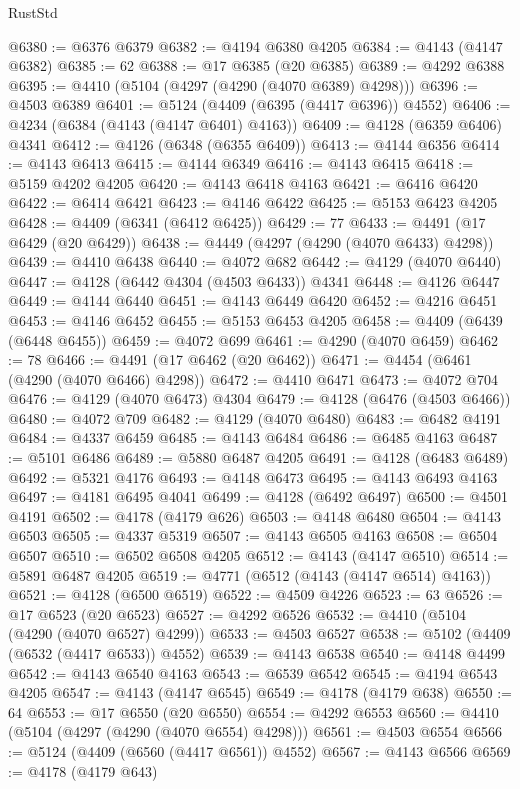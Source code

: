 \begin{lexlean}{RustStd}
\begin{coremodule}
@6380 := @6376 @6379
@6382 := @4194 @6380 @4205
@6384 := @4143 (@4147 @6382)
@6385 := 62
@6388 := @17 @6385 (@20 @6385)
@6389 := @4292 @6388
@6395 := @4410 (@5104 (@4297 (@4290 (@4070 @6389) @4298)))
@6396 := @4503 @6389
@6401 := @5124 (@4409 (@6395 (@4417 @6396)) @4552)
@6406 := @4234 (@6384 (@4143 (@4147 @6401) @4163))
@6409 := @4128 (@6359 @6406) @4341
@6412 := @4126 (@6348 (@6355 @6409))
@6413 := @4144 @6356
@6414 := @4143 @6413
@6415 := @4144 @6349
@6416 := @4143 @6415
@6418 := @5159 @4202 @4205
@6420 := @4143 @6418 @4163
@6421 := @6416 @6420
@6422 := @6414 @6421
@6423 := @4146 @6422
@6425 := @5153 @6423 @4205
@6428 := @4409 (@6341 (@6412 @6425))
@6429 := 77
@6433 := @4491 (@17 @6429 (@20 @6429))
@6438 := @4449 (@4297 (@4290 (@4070 @6433) @4298))
@6439 := @4410 @6438
@6440 := @4072 @682
@6442 := @4129 (@4070 @6440)
@6447 := @4128 (@6442 @4304 (@4503 @6433)) @4341
@6448 := @4126 @6447
@6449 := @4144 @6440
@6451 := @4143 @6449 @6420
@6452 := @4216 @6451
@6453 := @4146 @6452
@6455 := @5153 @6453 @4205
@6458 := @4409 (@6439 (@6448 @6455))
@6459 := @4072 @699
@6461 := @4290 (@4070 @6459)
@6462 := 78
@6466 := @4491 (@17 @6462 (@20 @6462))
@6471 := @4454 (@6461 (@4290 (@4070 @6466) @4298))
@6472 := @4410 @6471
@6473 := @4072 @704
@6476 := @4129 (@4070 @6473) @4304
@6479 := @4128 (@6476 (@4503 @6466))
@6480 := @4072 @709
@6482 := @4129 (@4070 @6480)
@6483 := @6482 @4191
@6484 := @4337 @6459
@6485 := @4143 @6484
@6486 := @6485 @4163
@6487 := @5101 @6486
@6489 := @5880 @6487 @4205
@6491 := @4128 (@6483 @6489)
@6492 := @5321 @4176
@6493 := @4148 @6473
@6495 := @4143 @6493 @4163
@6497 := @4181 @6495 @4041
@6499 := @4128 (@6492 @6497)
@6500 := @4501 @4191
@6502 := @4178 (@4179 @626)
@6503 := @4148 @6480
@6504 := @4143 @6503
@6505 := @4337 @5319
@6507 := @4143 @6505 @4163
@6508 := @6504 @6507
@6510 := @6502 @6508 @4205
@6512 := @4143 (@4147 @6510)
@6514 := @5891 @6487 @4205
@6519 := @4771 (@6512 (@4143 (@4147 @6514) @4163))
@6521 := @4128 (@6500 @6519)
@6522 := @4509 @4226
@6523 := 63
@6526 := @17 @6523 (@20 @6523)
@6527 := @4292 @6526
@6532 := @4410 (@5104 (@4290 (@4070 @6527) @4299))
@6533 := @4503 @6527
@6538 := @5102 (@4409 (@6532 (@4417 @6533)) @4552)
@6539 := @4143 @6538
@6540 := @4148 @4499
@6542 := @4143 @6540 @4163
@6543 := @6539 @6542
@6545 := @4194 @6543 @4205
@6547 := @4143 (@4147 @6545)
@6549 := @4178 (@4179 @638)
@6550 := 64
@6553 := @17 @6550 (@20 @6550)
@6554 := @4292 @6553
@6560 := @4410 (@5104 (@4297 (@4290 (@4070 @6554) @4298)))
@6561 := @4503 @6554
@6566 := @5124 (@4409 (@6560 (@4417 @6561)) @4552)
@6567 := @4143 @6566
@6569 := @4178 (@4179 @643)

\end{coremodule}
\end{lexlean}
